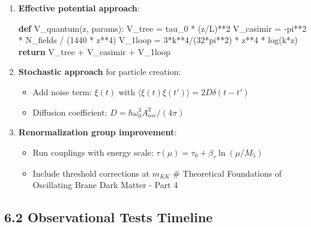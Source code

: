 \documentclass[
  11pt,
]{report}
\newenvironment{Shaded}{}{}
\newcommand{\ControlFlowTok}[1]{\textcolor[rgb]{0.00,0.44,0.13}{\textbf{#1}}}
\newcommand{\DecValTok}[1]{\textcolor[rgb]{0.25,0.63,0.44}{#1}}
\newcommand{\KeywordTok}[1]{\textcolor[rgb]{0.00,0.44,0.13}{\textbf{#1}}}
\newcommand{\NormalTok}[1]{#1}
\newcommand{\OperatorTok}[1]{\textcolor[rgb]{0.40,0.40,0.40}{#1}}
\providecommand{\tightlist}{%
  \setlength{\itemsep}{0pt}\setlength{\parskip}{0pt}}
\begin{document}
\begin{enumerate}
\def\labelenumi{\arabic{enumi}.}
\item
  \textbf{Effective potential approach}:

\begin{Shaded}
\begin{Highlighting}[]
\KeywordTok{def}\NormalTok{ V\_quantum(z, params):}
\NormalTok{    V\_tree }\OperatorTok{=}\NormalTok{ tau\_0 }\OperatorTok{*}\NormalTok{ (z}\OperatorTok{/}\NormalTok{L)}\OperatorTok{**}\DecValTok{2}
\NormalTok{    V\_casimir }\OperatorTok{=} \OperatorTok{{-}}\NormalTok{pi}\OperatorTok{**}\DecValTok{2} \OperatorTok{*}\NormalTok{ N\_fields }\OperatorTok{/}\NormalTok{ (}\DecValTok{1440} \OperatorTok{*}\NormalTok{ z}\OperatorTok{**}\DecValTok{4}\NormalTok{)}
\NormalTok{    V\_1loop }\OperatorTok{=} \DecValTok{3}\OperatorTok{*}\NormalTok{k}\OperatorTok{**}\DecValTok{4}\OperatorTok{/}\NormalTok{(}\DecValTok{32}\OperatorTok{*}\NormalTok{pi}\OperatorTok{**}\DecValTok{2}\NormalTok{) }\OperatorTok{*}\NormalTok{ z}\OperatorTok{**}\DecValTok{4} \OperatorTok{*}\NormalTok{ log(k}\OperatorTok{*}\NormalTok{z)}
    \ControlFlowTok{return}\NormalTok{ V\_tree }\OperatorTok{+}\NormalTok{ V\_casimir }\OperatorTok{+}\NormalTok{ V\_1loop}
\end{Highlighting}
\end{Shaded}
\item
  \textbf{Stochastic approach} for particle creation:

  \begin{itemize}
  \tightlist
  \item
    Add noise term: \(\xi(t)\) with
    \(\langle\xi(t)\xi(t')\rangle = 2D\delta(t-t')\)
  \item
    Diffusion coefficient: \(D = \hbar\omega_0^3 A_{osc}^2/(4\pi)\)
  \end{itemize}
\item
  \textbf{Renormalization group improvement}:

  \begin{itemize}
  \tightlist
  \item
    Run couplings with energy scale:
    \(\tau(\mu) = \tau_0 + \beta_\tau \ln(\mu/M_5)\)
  \item
    Include threshold corrections at \(m_{KK}\) \newpage \# Theoretical
    Foundations of Oscillating Brane Dark Matter - Part 4
  \end{itemize}
\end{enumerate}

\subsection{6.2 Observational Tests
Timeline}\label{observational-tests-timeline}
\end{document}
